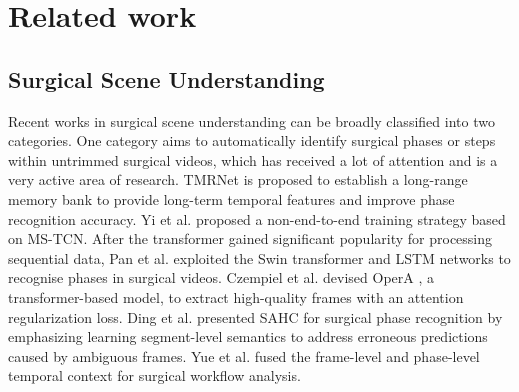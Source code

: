 \section{Related work}
\subsection{Surgical Scene Understanding} 
Recent works in surgical scene understanding can be broadly classified into two categories. One category aims to automatically identify surgical phases or steps within untrimmed surgical videos, which has received a lot of attention and is a very active area of research. TMRNet \cite{jin2021temporal} is proposed to establish a long-range memory bank to provide long-term temporal features and improve phase recognition accuracy. 
Yi et al.  \cite{yi2022not} proposed a non-end-to-end training strategy based on MS-TCN. After the transformer gained significant popularity for processing sequential data, Pan et al.  \cite{pan2023temporal} exploited the Swin transformer and LSTM networks 
to recognise phases in surgical videos. Czempiel et al. devised OperA \cite{czempiel2021opera}, a transformer-based model, to extract high-quality frames with an attention regularization loss.  Ding et al. \cite{ding2022exploring} presented SAHC for surgical phase recognition by emphasizing learning segment-level semantics to address erroneous predictions caused by ambiguous frames. Yue et al. \cite{yue2023cascade} fused the frame-level and phase-level temporal context for surgical workflow analysis. 

